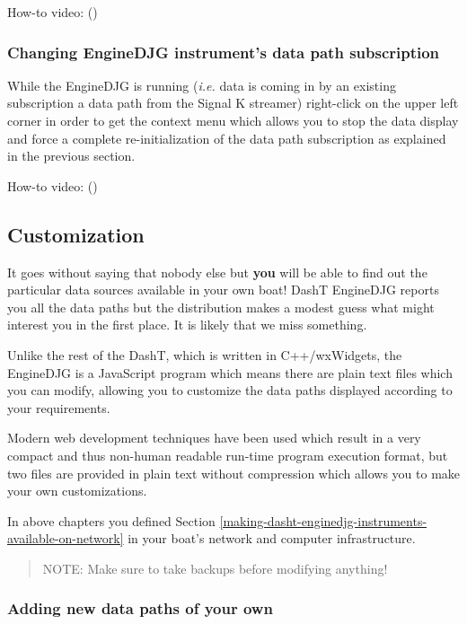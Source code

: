 \documentclass[11pt]{article}
\begin{document}
    How-to video: ()

    \hypertarget{changing-enginedjg-instruments-data-path-subscription}{%
\subsubsection{Changing EngineDJG instrument's data path
subscription}\label{changing-enginedjg-instruments-data-path-subscription}}

    While the EngineDJG is running (\emph{i.e.} data is coming in by an
existing subscription a data path from the Signal K streamer)
right-click on the upper left corner in order to get the context menu
which allows you to stop the data display and force a complete
re-initialization of the data path subscription as explained in the
previous section.

    How-to video: ()

    \hypertarget{customization}{%
\subsection{Customization}\label{customization}}

    It goes without saying that nobody else but \textbf{you} will be able to
find out the particular data sources available in your own boat! DashT
EngineDJG reports you all the data paths but the distribution makes a
modest guess what might interest you in the first place. It is likely
that we miss something.

    Unlike the rest of the DashT, which is written in C++/wxWidgets, the
EngineDJG is a JavaScript program which means there are plain text files
which you can modify, allowing you to customize the data paths displayed
according to your requirements.

    Modern web development techniques have been used which result in a very
compact and thus non-human readable run-time program execution format,
but two files are provided in plain text without compression which
allows you to make your own customizations.

    In above chapters you defined
Section \ref{making-dasht-enginedjg-instruments-available-on-network} in
your boat's network and computer infrastructure.

    \begin{quote}
NOTE: Make sure to take backups before modifying anything!
\end{quote}

    \hypertarget{adding-new-data-paths-of-your-own}{%
\subsubsection{Adding new data paths of your
own}\label{adding-new-data-paths-of-your-own}}
\end{document}
